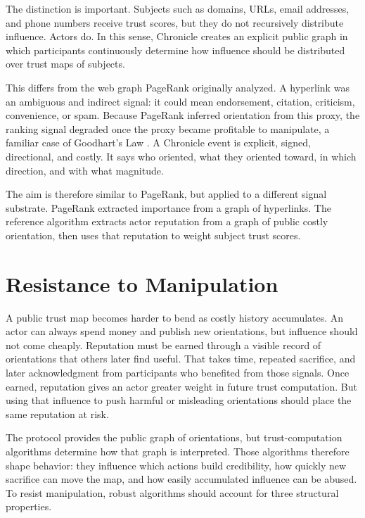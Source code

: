 \documentclass[11pt]{article}
\begin{document}
The distinction is important. Subjects such as domains, URLs, email addresses, and phone numbers receive trust scores, but they do not recursively distribute influence. Actors do. In this sense, Chronicle creates an explicit public graph in which participants continuously determine how influence should be distributed over trust maps of subjects.

This differs from the web graph PageRank originally analyzed. A hyperlink was an ambiguous and indirect signal: it could mean endorsement, citation, criticism, convenience, or spam. Because PageRank inferred orientation from this proxy, the ranking signal degraded once the proxy became profitable to manipulate, a familiar case of Goodhart's Law \cite{goodhart1975problems}. A Chronicle event is explicit, signed, directional, and costly. It says who oriented, what they oriented toward, in which direction, and with what magnitude.

The aim is therefore similar to PageRank, but applied to a different signal substrate. PageRank extracted importance from a graph of hyperlinks. The reference algorithm extracts actor reputation from a graph of public costly orientation, then uses that reputation to weight subject trust scores.

\section{Resistance to Manipulation}

A public trust map becomes harder to bend as costly history accumulates. An actor can always spend money and publish new orientations, but influence should not come cheaply. Reputation must be earned through a visible record of orientations that others later find useful. That takes time, repeated sacrifice, and later acknowledgment from participants who benefited from those signals. Once earned, reputation gives an actor greater weight in future trust computation. But using that influence to push harmful or misleading orientations should place the same reputation at risk.

The protocol provides the public graph of orientations, but trust-computation algorithms determine how that graph is interpreted. Those algorithms therefore shape behavior: they influence which actions build credibility, how quickly new sacrifice can move the map, and how easily accumulated influence can be abused. To resist manipulation, robust algorithms should account for three structural properties.
\end{document}
